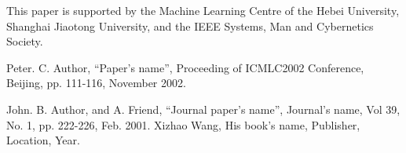 \documentclass[a4paper, times, 10pt,twocolumn]{article}
\begin{document}
This paper is supported by the Machine Learning Centre of the Hebei
University, Shanghai Jiaotong University, and the IEEE Systems, Man
and Cybernetics Society.

%
%

\begin{thebibliography}{99}
Peter. C. Author, ``Paper's name'', Proceeding of ICMLC2002
Conference, Beijing, pp. 111-116, November 2002.

 John. B. Author, and A. Friend, ``Journal paper's name'', Journal's
name, Vol 39, No. 1, pp. 222-226, Feb. 2001.
 Xizhao Wang, His book's name, Publisher, Location, Year.
\end{thebibliography}
\end{document}
